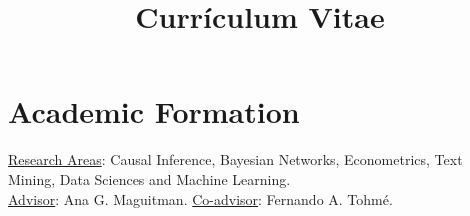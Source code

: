 \documentclass[a4paper]{moderncv} %
\title{Currículum Vitae} %
\begin{document}
\makecvtitle



\section{Academic Formation}\smallskip

{\underline{Research Areas}: Causal Inference, Bayesian Networks, Econometrics, Text Mining, Data Sciences and Machine Learning. \\ \underline{Advisor}: Ana G. Maguitman.  \underline{Co-advisor}: Fernando A. Tohmé. }


\smallskip
\end{document}
